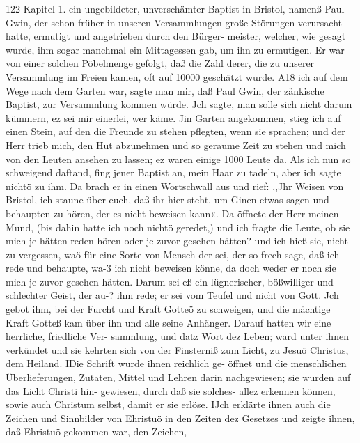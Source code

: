 122 Kapitel 1.
ein ungebildeter, unverschämter Baptist in Bristol, namenß Paul
Gwin, der schon früher in unseren Versammlungen große Störungen
verursacht hatte, ermutigt und angetrieben durch den Bürger-
meister, welcher, wie gesagt wurde, ihm sogar manchmal ein
Mittagessen gab, um ihn zu ermutigen. Er war von einer
solchen Pöbelmenge gefolgt, daß die Zahl derer, die zu unserer
Versammlung im Freien kamen, oft auf 10000 geschätzt wurde.
A18 ich auf dem Wege nach dem Garten war, sagte man mir,
daß Paul Gwin, der zänkische Baptist, zur Versammlung kommen
würde. Jch sagte, man solle sich nicht darum kümmern, ez sei
mir einerlei, wer käme. Jin Garten angekommen, stieg ich auf
einen Stein, auf den die Freunde zu stehen pflegten, wenn sie
sprachen; und der Herr trieb mich, den Hut abzunehmen und so
geraume Zeit zu stehen und mich von den Leuten ansehen zu
lassen; ez waren einige 1000 Leute da. Als ich nun so schweigend
daftand, fing jener Baptist an, mein Haar zu tadeln, aber ich
sagte nichtö zu ihm. Da brach er in einen Wortschwall aus und
rief: ,,Jhr Weisen von Bristol, ich staune über euch, daß ihr hier
steht, um Ginen etwas sagen und behaupten zu hören, der es
nicht beweisen kann«. Da öffnete der Herr meinen Mund, (bis
dahin hatte ich noch nichtö geredet,) und ich fragte die Leute, ob
sie mich je hätten reden hören oder je zuvor gesehen hätten? und
ich hieß sie, nicht zu vergessen, waö für eine Sorte von Mensch
der sei, der so frech sage, daß ich rede und behaupte, wa-3 ich
nicht beweisen könne, da doch weder er noch sie mich je zuvor
gesehen hätten. Darum sei eß ein lügnerischer, bößwilliger und
schlechter Geist, der au-? ihm rede; er sei vom Teufel und nicht
von Gott. Jch gebot ihm, bei der Furcht und Kraft Gotteö zu
schweigen, und die mächtige Kraft Gotteß kam über ihn und alle
seine Anhänger. Darauf hatten wir eine herrliche, friedliche Ver-
sammlung, und datz Wort dez Leben; ward unter ihnen verkündet
und sie kehrten sich von der Finsterniß zum Licht, zu Jesuö
Christus, dem Heiland. IDie Schrift wurde ihnen reichlich ge-
öffnet und die menschlichen Überlieferungen, Zutaten, Mittel und
Lehren darin nachgewiesen; sie wurden auf das Licht Christi hin-
gewiesen, durch daß sie solches- allez erkennen können, sowie auch
Christum selbst, damit er sie erlöse. IJch erklärte ihnen auch die
Zeichen und Sinnbilder von Ehristuö in den Zeiten dez Gesetzes
und zeigte ihnen, daß Ehristuö gekommen war, den Zeichen,


